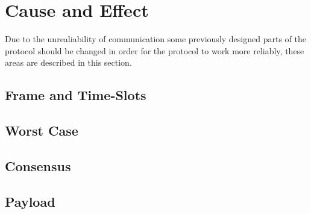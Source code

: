 \section{Cause and Effect}
Due to the unrealiability of communication some previously designed parts of the protocol should be changed in order for the protocol to work more reliably, these areas are described in this section.
\subsection{Frame and Time-Slots}

\subsection{Worst Case}

\subsection{Consensus}

\subsection{Payload}


